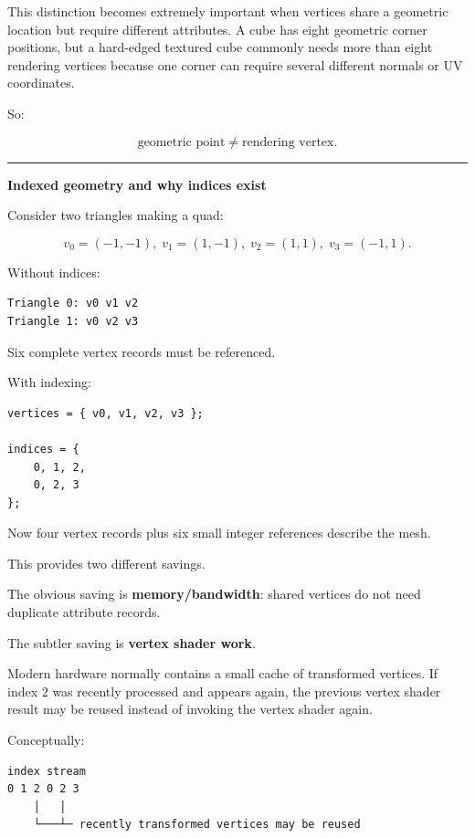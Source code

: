 This distinction becomes extremely important when vertices share a geometric location but require different attributes. A cube has eight geometric corner positions, but a hard-edged textured cube commonly needs more than eight rendering vertices because one corner can require several different normals or UV coordinates.

So:

\[
\text{geometric point} \neq \text{rendering vertex}.
\]

\begin{center}\rule{0.5\linewidth}{0.5pt}\end{center}

\textbf{Indexed geometry and why indices exist}

Consider two triangles making a quad:

\[
v_0=(-1,-1),\;
v_1=(1,-1),\;
v_2=(1,1),\;
v_3=(-1,1).
\]

Without indices:

\begin{verbatim}
Triangle 0: v0 v1 v2
Triangle 1: v0 v2 v3
\end{verbatim}

Six complete vertex records must be referenced.

With indexing:

\begin{verbatim}
vertices = { v0, v1, v2, v3 };

indices = {
    0, 1, 2,
    0, 2, 3
};
\end{verbatim}

Now four vertex records plus six small integer references describe the mesh.

This provides two different savings.

The obvious saving is \textbf{memory/bandwidth}: shared vertices do not need duplicate attribute records.

The subtler saving is \textbf{vertex shader work}.

Modern hardware normally contains a small cache of transformed vertices. If index \(2\) was recently processed and appears again, the previous vertex shader result may be reused instead of invoking the vertex shader again.

Conceptually:

\begin{verbatim}
index stream
0 1 2 0 2 3
    │   │
    └───┴─ recently transformed vertices may be reused
\end{verbatim}

